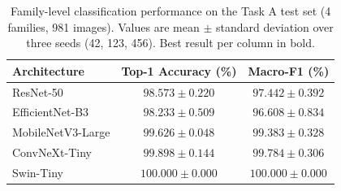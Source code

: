 \begin{table}[t]
\centering
\caption{Family-level classification performance on the Task A test set
(4 families, 981 images). Values are mean $\pm$ standard deviation over
three seeds (42, 123, 456). Best result per column in bold.}
\label{tab:task_a}
\begin{tabular}{lcc}
\toprule
\textbf{Architecture} & \textbf{Top-1 Accuracy (\%)} & \textbf{Macro-F1 (\%)} \\
\midrule
ResNet-50          & $98.573 \pm 0.220$ & $97.442 \pm 0.392$ \\
EfficientNet-B3    & $98.233 \pm 0.509$ & $96.608 \pm 0.834$ \\
MobileNetV3-Large  & $99.626 \pm 0.048$ & $99.383 \pm 0.328$ \\
ConvNeXt-Tiny      & $99.898 \pm 0.144$ & $99.784 \pm 0.306$ \\
Swin-Tiny          & $\mathbf{100.000 \pm 0.000}$ & $\mathbf{100.000 \pm 0.000}$ \\
\bottomrule
\end{tabular}
\end{table}
